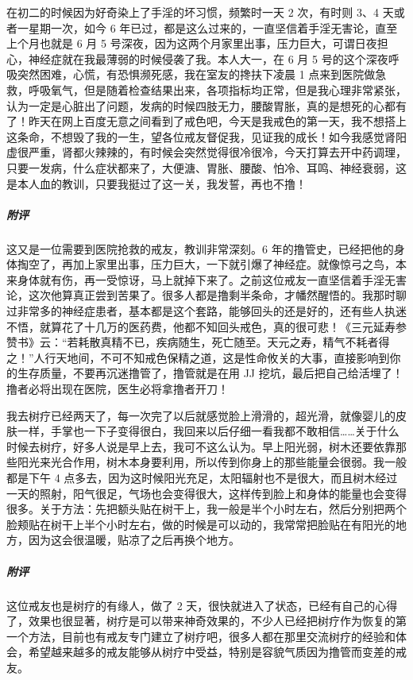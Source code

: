 \begin{case}
    在初二的时候因为好奇染上了手淫的坏习惯，频繁时一天 2 次，有时则 3、4 天或者一星期一次，如今 6 年已过，都是这么过来的，一直坚信着手淫无害论，直至上个月也就是 6 月 5 号深夜，因为这两个月家里出事，压力巨大，可谓日夜担心，神经症就在我最薄弱的时候侵袭了我。本人大一，在 6 月 5 号的这个深夜呼吸突然困难，心慌，有恐惧濒死感，我在室友的搀扶下凌晨 1 点来到医院做急救，呼吸氧气，但是随着检查结果出来，各项指标均正常，但是我心理非常紧张，认为一定是心脏出了问题，发病的时候四肢无力，腰酸胃胀，真的是想死的心都有了！昨天在网上百度无意之间看到了戒色吧，今天是我戒色的第一天，我不想搭上这条命，不想毁了我的一生，望各位戒友督促我，见证我的成长！如今我感觉肾阳虚很严重，肾都火辣辣的，有时候会突然觉得很冷很冷，今天打算去开中药调理，只要一发病，什么症状都来了，大便溏、胃胀、腰酸、怕冷、耳鸣、神经衰弱，这是本人血的教训，只要我挺过了这一关，我发誓，再也不撸！
    \subparagraph{附评} 这又是一位需要到医院抢救的戒友，教训非常深刻。6 年的撸管史，已经把他的身体掏空了，再加上家里出事，压力巨大，一下就引爆了神经症。就像惊弓之鸟，本来身体就有伤，再一受惊讶，马上就掉下来了。之前这位戒友一直坚信着手淫无害论，这次他算真正尝到苦果了。很多人都是撸剩半条命，才幡然醒悟的。我那时聊过非常多的神经症患者，基本都是这个套路，能够回头的还是好的，还有些人执迷不悟，就算花了十几万的医药费，他都不知回头戒色，真的很可悲！《三元延寿参赞书》云：“若耗散真精不已，疾病随生，死亡随至。天元之寿，精气不耗者得之！”人行天地间，不可不知戒色保精之道，这是性命攸关的大事，直接影响到你的生存质量，不要再沉迷撸管了，撸管就是在用 JJ 挖坑，最后把自己给活埋了！撸者必将出现在医院，医生必将拿撸者开刀！
\end{case}

\begin{case}[树疗]
    我去树疗已经两天了，每一次完了以后就感觉脸上滑滑的，超光滑，就像婴儿的皮肤一样，手掌也一下子变得很白，我回来以后仔细一看我都不敢相信……关于什么时候去树疗，好多人说是早上去，我可不这么认为。早上阳光弱，树木还要依靠那些阳光来光合作用，树木本身要利用，所以传到你身上的那些能量会很弱。我一般都是下午 4 点多去，因为这时候阳光充足，太阳辐射也不是很大，而且树木经过一天的照射，阳气很足，气场也会变得很大，这样传到脸上和身体的能量也会变得很多。关于方法：先把额头贴在树干上，我一般是半个小时左右，然后分别把两个脸颊贴在树干上半个小时左右，做的时候是可以动的，我常常把脸贴在有阳光的地方，因为这会很温暖，贴凉了之后再换个地方。
    \subparagraph{附评} 这位戒友也是树疗的有缘人，做了 2 天，很快就进入了状态，已经有自己的心得了，效果也很显著，树疗是可以带来神奇效果的，不少人已经把树疗作为恢复的第一个方法，目前也有戒友专门建立了树疗吧，很多人都在那里交流树疗的经验和体会，希望越来越多的戒友能够从树疗中受益，特别是容貌气质因为撸管而变差的戒友。
\end{case}


